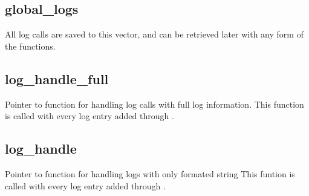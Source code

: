 \documentclass[letterpaper,10pt,english]{sphinxmanual}
\begin{document}
\subsection{global\_logs}
\label{\detokenize{log:global-logs}}

\begin{fulllineitems}
\label{\detokenize{log:_CPPv2N6pessum11global_logsE}}%
\pysigstartmultiline
{}%
\pysigstopmultiline
All log calls are saved to this vector, and can be retrieved later with any
form of the {\hyperref[\detokenize{log:_CPPv2N6pessum6GetLogEi}]{}} functions.

\end{fulllineitems}



\subsection{log\_handle\_full}
\label{\detokenize{log:log-handle-full}}

\begin{fulllineitems}
\label{\detokenize{log:_CPPv2N6pessum15log_handle_fullE}}%
\pysigstartmultiline
{}%
\pysigstopmultiline
Pointer to function for handling log calls with full log information.
This function is called with every log entry added through {\hyperref[\detokenize{log:_CPPv2N6pessum3LogEiNSt6stringENSt6stringEz}]{}}.

\end{fulllineitems}



\subsection{log\_handle}
\label{\detokenize{log:log-handle}}

\begin{fulllineitems}
\label{\detokenize{log:_CPPv2N6pessum10log_handleE}}%
\pysigstartmultiline
{}%
\pysigstopmultiline
Pointer to function for handling logs with only formated string
This funtion is called with every log entry added through {\hyperref[\detokenize{log:_CPPv2N6pessum3LogEiNSt6stringENSt6stringEz}]{}}.

\end{fulllineitems}
\end{document}
